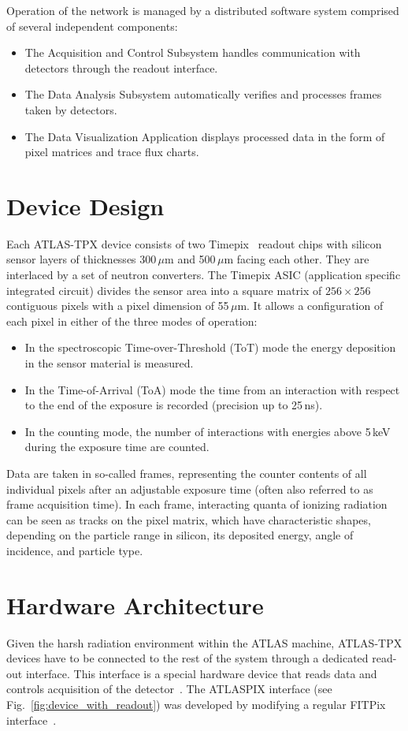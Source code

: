 \documentclass[journal]{IEEEtran}
\begin{document}
Operation of the network is managed by a distributed software system comprised of several independent components:
~
\begin{itemize}
\item The Acquisition and Control Subsystem handles communication with detectors through the readout interface.
\item The Data Analysis Subsystem automatically verifies and processes frames taken by detectors.
\item The Data Visualization Application displays processed data in the form of pixel matrices and trace flux charts.
\end{itemize}

\section{\label{sec:device}Device Design}
Each ATLAS-TPX device consists of two Timepix~\cite{Llopart2007} readout chips with silicon sensor layers of thicknesses 300\,$\mu$m and 500\,$\mu$m facing each other. They are interlaced by a set of neutron converters. The Timepix ASIC (application specific integrated circuit) divides the sensor area into a square matrix of $256 \times 256$ contiguous pixels with a pixel dimension of 55\,$\mu$m. It allows a configuration of each pixel in either of the three modes of operation: 
~
\begin{itemize}
\item In the spectroscopic Time-over-Threshold (ToT) mode the energy deposition in the sensor material is measured.
\item In the Time-of-Arrival (ToA) mode the time from an interaction with respect to the end of the exposure is recorded (precision up to 25\,ns).
\item In the counting mode, the number of interactions with energies above 5\,keV during the exposure time are counted.
\end{itemize}

Data are taken in so-called frames, representing the counter contents of all individual pixels after an adjustable exposure time (often also referred to as frame acquisition time). In each frame, interacting quanta of ionizing radiation can be seen as tracks on the pixel matrix, which have characteristic shapes, depending on the particle range in silicon, its deposited energy, angle of incidence, and particle type. 

\section{\label{sec:hardware}Hardware Architecture}
Given the harsh radiation environment within the ATLAS machine, ATLAS-TPX devices have to be connected to the rest of the system through a dedicated read-out interface. This interface is a special hardware device that reads data and controls acquisition of the detector~\cite{Pixelman}. The ATLASPIX interface (see Fig.~\ref{fig:device_with_readout}) was developed by modifying a regular FITPix interface~\cite{FITPix}.
\end{document}
